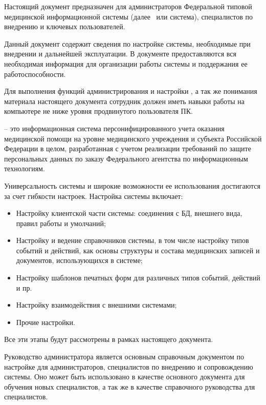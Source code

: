 \newpage
{}

Настоящий документ предназначен для администраторов Федеральной типовой медицинской информационной системы (далее \tmis~или система), специалистов по внедрению и ключевых пользователей. 

Данный документ содержит сведения по настройке системы, необходимые при внедрении и дальнейшей эксплуатации. В документе предоставляются вся необходимая информация для организации работы системы и поддержания ее работоспособности.

Для выполнения функций администрирования и настройки \tmis, а так же понимания материала настоящего документа сотрудник должен иметь навыки работы на компьютере не ниже уровня продвинутого пользователя ПК.

\textbf{\tmis} – это информационная система персонифицированного учета оказания медицинской помощи на уровне медицинского учреждения и субъекта Российской Федерации в целом, разработанная с учетом реализации требований по защите персональных данных по заказу Федерального агентства по информационным технологиям. \index{\tmis}

Универсальность системы и широкие возможности ее использования достигаются за счет гибкости настроек. Настройка системы включает:
\begin{itemize}
 \item Настройку клиентской части системы: соединения с БД, внешнего вида, правил работы и умолчаний;
 \item Настройку и ведение справочников системы, в том числе настройку типов событий и действий, как основы структуры и состава медицинских записей и документов, использующихся в системе;
 \item Настройку шаблонов печатных форм для различных типов событий, действий и пр.
 \item Настройку взаимодействия с внешними системами;
 \item Прочие настройки.
\end{itemize}
 
Все эти этапы будут рассмотрены в рамках настоящего документа.

\newpage
{}

Руководство администратора является основным справочным документом по настройке \tmis для администраторов, специалистов по внедрению и сопровождению системы. Оно может быть использовано в качестве основного документа для обучения новых специалистов, а так же в качестве справочного руководства для специалистов.

